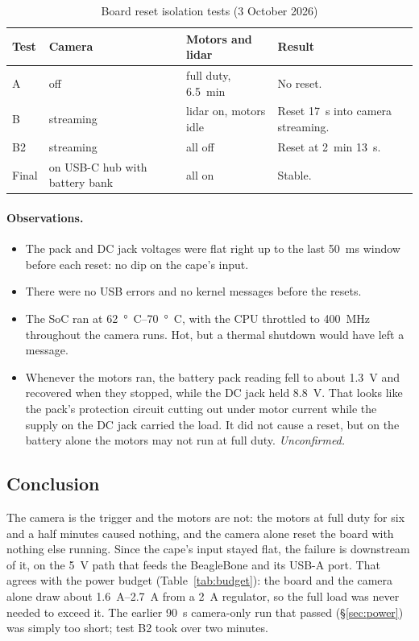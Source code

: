 \begin{table}[htbp]
\centering
\caption{Board reset isolation tests (3 October 2026)}
\label{tab:resettests}
\small
\begin{tabularx}{\linewidth}{lllX}
\toprule
Test & Camera & Motors and lidar & Result \\
\midrule
A & off & full duty, \SI{6.5}{min} & No reset. \\
B & streaming & lidar on, motors idle & Reset \SI{17}{s} into camera streaming. \\
B2 & streaming & all off & Reset at \SI{2}{min} \SI{13}{s}. \\
Final & on USB-C hub with battery bank & all on & Stable. \\
\bottomrule
\end{tabularx}
\end{table}

\paragraph{Observations.}
\begin{itemize}
\item The pack and DC jack voltages were flat right up to the last
  \SI{50}{ms} window before each reset: no dip on the cape's input.
\item There were no USB errors and no kernel messages before the resets.
\item The SoC ran at \SIrange{62}{70}{\degree C}, with the CPU throttled to
  \SI{400}{MHz} throughout the camera runs. Hot, but a thermal shutdown would
  have left a message.
\item Whenever the motors ran, the battery pack reading fell to about
  \SI{1.3}{V} and recovered when they stopped, while the DC jack held
  \SI{8.8}{V}. That looks like the pack's protection circuit cutting out
  under motor current while the supply on the DC jack carried the load.
  It did not cause a reset, but on the battery alone the motors may not run
  at full duty. \emph{Unconfirmed.}
\end{itemize}

\subsection{Conclusion}

The camera is the trigger and the motors are not: the motors at full duty
for six and a half minutes caused nothing, and the camera alone reset the
board with nothing else running. Since the cape's input stayed flat, the
failure is downstream of it, on the \SI{5}{V} path that feeds the
BeagleBone and its USB-A port. That agrees with the power budget
(Table~\ref{tab:budget}): the board and the camera alone draw about
\SIrange{1.6}{2.7}{A} from a \SI{2}{A} regulator, so the full load was never
needed to exceed it. The earlier \SI{90}{s} camera-only run that passed
(\S\ref{sec:power}) was simply too short; test B2 took over two minutes.

